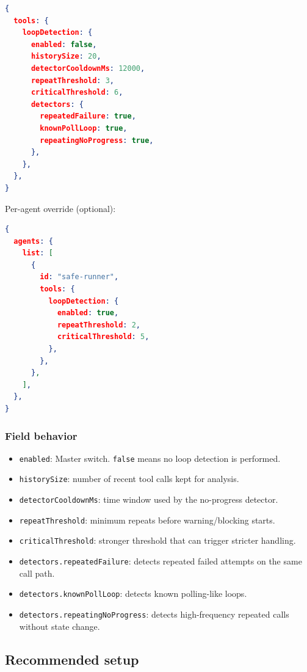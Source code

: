 \begin{lstlisting}[language=json]
{
  tools: {
    loopDetection: {
      enabled: false,
      historySize: 20,
      detectorCooldownMs: 12000,
      repeatThreshold: 3,
      criticalThreshold: 6,
      detectors: {
        repeatedFailure: true,
        knownPollLoop: true,
        repeatingNoProgress: true,
      },
    },
  },
}
\end{lstlisting}


Per-agent override (optional):

\begin{lstlisting}[language=json]
{
  agents: {
    list: [
      {
        id: "safe-runner",
        tools: {
          loopDetection: {
            enabled: true,
            repeatThreshold: 2,
            criticalThreshold: 5,
          },
        },
      },
    ],
  },
}
\end{lstlisting}


\subsubsection{Field behavior}


\begin{itemize}
  \item \texttt{enabled}: Master switch. \texttt{false} means no loop detection is performed.
  \item \texttt{historySize}: number of recent tool calls kept for analysis.
  \item \texttt{detectorCooldownMs}: time window used by the no-progress detector.
  \item \texttt{repeatThreshold}: minimum repeats before warning/blocking starts.
  \item \texttt{criticalThreshold}: stronger threshold that can trigger stricter handling.
  \item \texttt{detectors.repeatedFailure}: detects repeated failed attempts on the same call path.
  \item \texttt{detectors.knownPollLoop}: detects known polling-like loops.
  \item \texttt{detectors.repeatingNoProgress}: detects high-frequency repeated calls without state change.
\end{itemize}


\subsection{Recommended setup}


